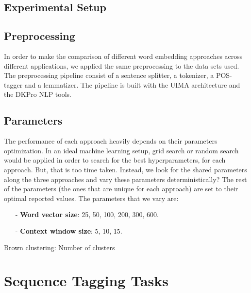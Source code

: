 \documentclass[11pt]{article}
\begin{document}
\subsection{Experimental Setup}

\subsection{Preprocessing}

In order to make the comparison of different word embedding approaches across different applications, we applied the same preprocessing to the data sets used. 
The preprocessing pipeline consist of a sentence splitter, a tokenizer, a POS-tagger and a lemmatizer. The pipeline is built with the UIMA architecture and the DKPro NLP tools. 


\subsection{Parameters}

The performance of each approach heavily depends on their parameters optimization.
In an ideal machine learning setup, grid search or random search would be applied in order to search for the best hyperparameters, for each approach.
But, that is too time taken. Instead, we look for the shared parameters along the three approaches and vary these parameters deterministically? 
The rest of the parameters (the ones that are unique for each approach) are set to  their optimal reported values.
The parameters that we vary are:



\begin{itemize}
\item[-]\textbf{Word vector size}: 25, 50, 100, 200, 300, 600.
\item[-]\textbf{Context window size}: 5, 10, 15.
\end{itemize}

Brown clustering: Number of clusters


\section{Sequence Tagging Tasks}
\end{document}
